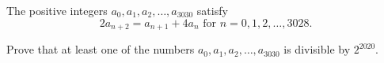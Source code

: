 The positive integers $a_0, a_1, a_2, \ldots, a_{3030}$ satisfy $$2a_{n + 2} = a_{n + 1} + 4a_n \text{ for } n = 0, 1, 2, \ldots, 3028.$$

Prove that at least one of the numbers $a_0, a_1, a_2, \ldots, a_{3030}$ is divisible by $2^{2020}$.